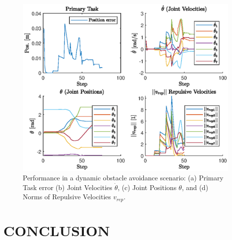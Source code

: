 \documentclass[letterpaper, 10 pt, conference]{ieeeconf}  %
\begin{document}
\begin{figure}
	\centering
	\includegraphics[width=1\linewidth]{4plots_ball.eps} %
	\caption{Performance in a dynamic obstacle avoidance scenario: (a) Primary Task error (b) Joint Velocities $\dot{\theta}$, (c) Joint Positions $\theta$, and (d) Norms of Repulsive Velocities $v_{rep}$.}
	\label{fig:plots-ball}
\end{figure}
%



\section{CONCLUSION}

%
\end{document}
